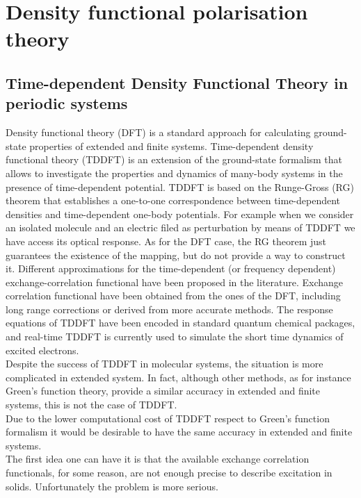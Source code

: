 \chapter{Density functional polarisation theory}
\label{chaptertddft}
\section{Time-dependent Density Functional Theory in periodic systems}
Density functional theory (DFT)\cite{PhysRev.140.A1133,PhysRev.136.B864} is a standard approach for calculating ground-state properties of extended and finite systems\cite{doi:10.1021/jp960669l,RevModPhys.87.897}. Time-dependent density functional theory (TDDFT) is an extension of the ground-state formalism that allows to investigate the properties and dynamics of many-body systems in the presence of time-dependent potential. TDDFT is based on the Runge-Gross (RG) theorem\cite{PhysRevLett.52.997}  that establishes a one-to-one correspondence between time-dependent densities and time-dependent one-body potentials. For example when we consider an isolated molecule and an electric filed as  perturbation by means of TDDFT we have access its optical response. As for the DFT case, the RG theorem just guarantees the existence of the mapping, but do not provide a way to construct it. Different approximations for the time-dependent (or frequency dependent) exchange-correlation functional have been proposed in the literature. Exchange correlation functional have been obtained from the ones of the DFT, including long range corrections or derived from more accurate methods\cite{Onida,faber2014excited}. The response equations of TDDFT have been encoded in standard quantum chemical packages\cite{valiev2010nwchem}, and real-time TDDFT is currently used to simulate the short time dynamics of excited electrons\cite{PSSB:PSSB200642067}.\\
Despite the success of TDDFT in molecular systems, the situation is more complicated in extended system. 
In fact, although other methods, as for instance Green's function theory\cite{strinati}, provide a similar accuracy in extended\cite{Aulbur19991} and finite systems\cite{blase2011charge,faber2012electron}, this is not the case of TDDFT.\\
Due to the lower computational cost of TDDFT respect to Green's function formalism it would be desirable to have the same accuracy in extended and finite systems.\\
The first idea one can have it is that the available exchange correlation functionals, for some reason, are not enough precise to describe excitation in solids. Unfortunately the problem is more serious.\cite{maitra2003current}
